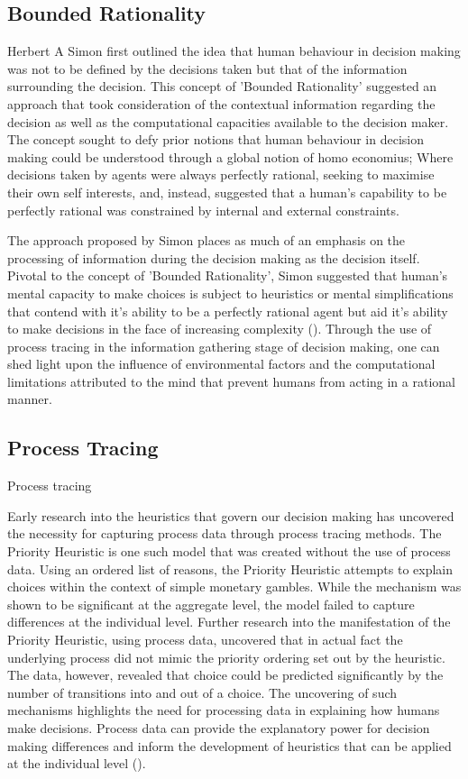 \documentclass[man, floatsintext]{apa7}
\begin{document}
\subsection{Bounded Rationality}

Herbert A Simon first outlined the idea that human behaviour in decision making was not to be defined by the decisions taken but that of the information surrounding the decision. This concept of 'Bounded Rationality' suggested an approach that took consideration of the contextual information regarding the decision as well as the computational capacities available to the decision maker. The concept sought to defy prior notions that human behaviour in decision making could be understood through a global notion of homo economius; Where decisions taken by agents were always perfectly rational, seeking to maximise their own self interests, and, instead, suggested that a human's capability to be perfectly rational was constrained by internal and external constraints.

The approach proposed by Simon places as much of an emphasis on the processing of information during the decision making as the decision itself. Pivotal to the concept of 'Bounded Rationality', Simon suggested that human's mental capacity to make choices is subject to heuristics or mental simplifications that contend with it's ability to be a perfectly rational agent but aid it's ability to make decisions in the face of increasing complexity (\cite{payneTaskComplexityContingent1976}). Through the use of process tracing in the information gathering stage of decision making, one can shed light upon the influence of environmental factors and the computational limitations attributed to the mind that prevent humans from acting in a rational manner.


\subsection{Process Tracing}

Process tracing 

Early research into the heuristics that govern our decision making has uncovered the necessity for capturing process data through process tracing methods. The Priority Heuristic is one such model that was created without the use of process data. Using an ordered list of reasons, the Priority Heuristic attempts to explain choices within the context of simple monetary gambles. While the mechanism was shown to be significant at the aggregate level, the model failed to capture differences at the individual level. Further research into the manifestation of the Priority Heuristic, using process data, uncovered that in actual fact the underlying process did not mimic the priority ordering set out by the heuristic. The data, however, revealed that choice could be predicted significantly by the number of transitions into and out of a choice. The uncovering of such mechanisms highlights the need for processing data in explaining how humans make decisions. Process data can provide the explanatory power for decision making differences and inform the development of heuristics that can be applied at the individual level (\cite{brandstatterPriorityHeuristicMaking2006}).
\end{document}
